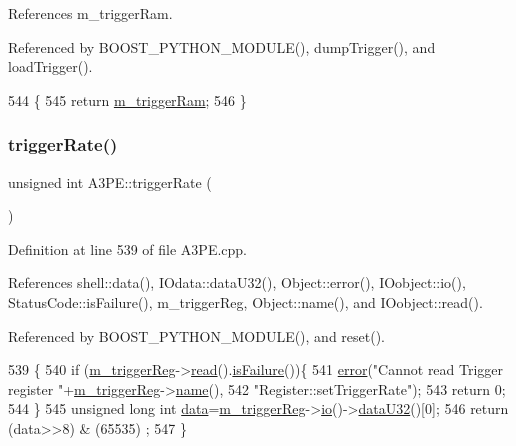 References m\+\_\+trigger\+Ram.



Referenced by B\+O\+O\+S\+T\+\_\+\+P\+Y\+T\+H\+O\+N\+\_\+\+M\+O\+D\+U\+L\+E(), dump\+Trigger(), and load\+Trigger().


\begin{DoxyCode}
544                    \{
545     \textcolor{keywordflow}{return} \hyperlink{classA3PE_a2b40e3937f0aa008ec7073acc5029fcc}{m\_triggerRam};
546   \}
\end{DoxyCode}
\mbox{\label{classA3PE_ada46375753047d6a74acdec442044f39}} 
\subsubsection{\texorpdfstring{trigger\+Rate()}{triggerRate()}}
{\footnotesize\ttfamily unsigned int A3\+P\+E\+::trigger\+Rate (\begin{DoxyParamCaption}{ }\end{DoxyParamCaption})}



Definition at line 539 of file A3\+P\+E.\+cpp.



References shell\+::data(), I\+Odata\+::data\+U32(), Object\+::error(), I\+Oobject\+::io(), Status\+Code\+::is\+Failure(), m\+\_\+trigger\+Reg, Object\+::name(), and I\+Oobject\+::read().



Referenced by B\+O\+O\+S\+T\+\_\+\+P\+Y\+T\+H\+O\+N\+\_\+\+M\+O\+D\+U\+L\+E(), and reset().


\begin{DoxyCode}
539                               \{
540   \textcolor{keywordflow}{if} (\hyperlink{classA3PE_a750158ae488121ab7969452f061e678c}{m\_triggerReg}->\hyperlink{classIOobject_aa07610c11963b1db6710e3c76ceea456}{read}().\hyperlink{classStatusCode_a5dd22dc6eb2c52fc4cabc58f6dea2eb7}{isFailure}())\{
541     \hyperlink{classObject_a204a95f57818c0f811933917a30eff45}{error}(\textcolor{stringliteral}{"Cannot read Trigger register "}+\hyperlink{classA3PE_a750158ae488121ab7969452f061e678c}{m\_triggerReg}->\hyperlink{classObject_a300f4c05dd468c7bb8b3c968868443c1}{name}(),
542         \textcolor{stringliteral}{"Register::setTriggerRate"});
543     \textcolor{keywordflow}{return} 0;
544   \}
545   \textcolor{keywordtype}{unsigned} \textcolor{keywordtype}{long} \textcolor{keywordtype}{int} \hyperlink{namespaceshell_a5ea2525995cedc3efd69ea8a7f034d1e}{data}=\hyperlink{classA3PE_a750158ae488121ab7969452f061e678c}{m\_triggerReg}->\hyperlink{classIOobject_af04fb94137c3d86849f478ac5afab5d1}{io}()->\hyperlink{classIOdata_ab0e3cd09f46c1c3712f797116f6da074}{dataU32}()[0];
546   \textcolor{keywordflow}{return} (data>>8) & (65535) ; 
547 \}
\end{DoxyCode}
\mbox{\label{classA3PE_a4bf922f391fee6753fb0d53e133603b7}} 
